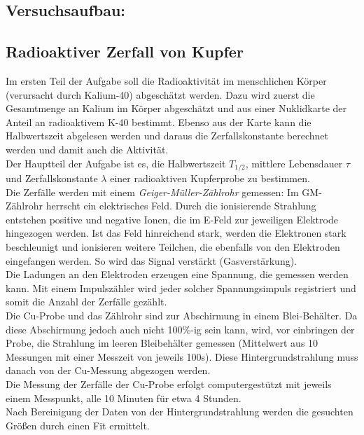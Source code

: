 \documentclass[12pt,a4paper]{article}
\begin{document}
\begin{multicols}{2}
\pagebreak
\section{Versuchsaufbau:}



\subsection{Radioaktiver Zerfall von Kupfer}

Im ersten Teil der Aufgabe soll die Radioaktivität im menschlichen Körper (verursacht durch Kalium-40) abgeschätzt werden. Dazu wird zuerst die Gesamtmenge an Kalium im Körper abgeschätzt und aus einer Nuklidkarte der Anteil an radioaktivem K-40 bestimmt. Ebenso aus der Karte kann die Halbwertszeit abgelesen werden und daraus die Zerfallskonstante berechnet werden und damit auch die Aktivität.\\

\noindent Der Hauptteil der Aufgabe ist es, die Halbwertszeit $T_{1/2}$, mittlere Lebensdauer $\tau$ und Zerfallskonstante $\lambda$ einer radioaktiven Kupferprobe zu bestimmen.\\
Die Zerfälle werden mit einem \emph{Geiger-Müller-Zählrohr} gemessen: Im GM-Zählrohr herrscht ein elektrisches Feld. Durch die ionisierende Strahlung entstehen positive und negative Ionen, die im E-Feld zur jeweiligen Elektrode hingezogen werden. Ist das Feld hinreichend stark, werden die Elektronen stark beschleunigt und ionisieren weitere Teilchen, die ebenfalls von den Elektroden eingefangen werden. So wird das Signal verstärkt (Gasverstärkung).\\
Die Ladungen an den Elektroden erzeugen eine Spannung, die gemessen werden kann. Mit einem Impulszähler wird jeder solcher Spannungsimpuls registriert und somit die Anzahl der Zerfälle gezählt.\\

\noindent Die Cu-Probe und das Zählrohr sind zur Abschirmung in einem Blei-Behälter. Da diese Abschirmung jedoch auch nicht 100\%-ig sein kann, wird, vor einbringen der Probe, die Strahlung im leeren Bleibehälter gemessen (Mittelwert aus 10 Messungen mit einer Messzeit von jeweils 100s). Diese Hintergrundstrahlung muss danach von der Cu-Messung abgezogen werden.\\
Die Messung der Zerfälle der Cu-Probe erfolgt computergestützt mit jeweils einem Messpunkt, alle 10 Minuten für etwa 4 Stunden.\\
Nach Bereinigung der Daten von der Hintergrundstrahlung werden die gesuchten Größen durch einen Fit ermittelt.


\end{multicols}
\end{document}
